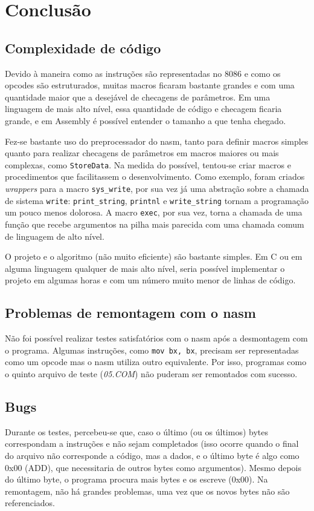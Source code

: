 \documentclass{article}
\begin{document}
\section{Conclusão}
\subsection{Complexidade de código}
Devido à maneira como as instruções são representadas no 8086 e como os opcodes são estruturados, muitas macros ficaram bastante grandes e com uma quantidade maior que a desejável de checagens de parâmetros. Em uma linguagem de mais alto nível, essa quantidade de código e checagem ficaria grande, e em Assembly é possível entender o tamanho a que tenha chegado.

Fez-se bastante uso do preprocessador do nasm, tanto para definir macros simples quanto para realizar checagens de parâmetros em macros maiores ou mais complexas, como \texttt{StoreData}. Na medida do possível, tentou-se criar macros e procedimentos que facilitassem o desenvolvimento. Como exemplo, foram criados \textit{wrappers} para a macro \texttt{sys\_write}, por sua vez já uma abstração sobre a chamada de sistema \texttt{write}: \texttt{print\_string}, \texttt{printnl} e \texttt{write\_string} tornam a programação um pouco menos dolorosa. A macro \texttt{exec}, por sua vez, torna a chamada de uma função que recebe argumentos na pilha mais parecida com uma chamada comum de linguagem de alto nível.

O projeto e o algoritmo (não muito eficiente) são bastante simples. Em C ou em alguma linguagem qualquer de mais alto nível, seria possível implementar o projeto em algumas horas e com um número muito menor de linhas de código.

\subsection{Problemas de remontagem com o nasm}
Não foi possível realizar testes satisfatórios com o nasm após a desmontagem com o programa. Algumas instruções, como \texttt{mov bx, bx}, precisam ser representadas como um opcode mas o nasm utiliza outro equivalente. Por isso, programas como o quinto arquivo de teste (\textit{05.COM}) não puderam ser remontados com sucesso.

\subsection{Bugs}
Durante os testes, percebeu-se que, caso o último (ou os últimos) bytes correspondam a instruções e não sejam completados (isso ocorre quando o final do arquivo não corresponde a código, mas a dados, e o último byte é algo como 0x00 (ADD), que necessitaria de outros bytes como argumentos). Mesmo depois do último byte, o programa procura mais bytes e os escreve (0x00). Na remontagem, não há grandes problemas, uma vez que os novos bytes não são referenciados.
\end{document}
